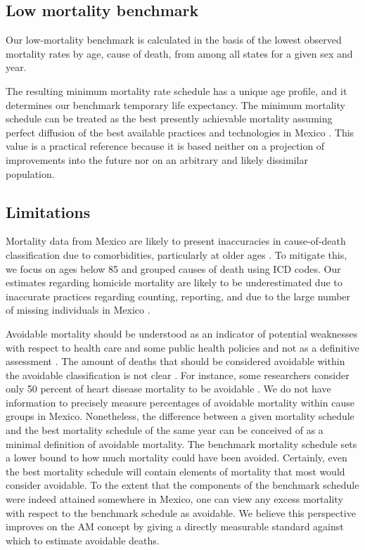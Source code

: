 \documentclass{bmcart}
\begin{document}
\subsection*{Low mortality benchmark}
Our low-mortality benchmark is calculated in the basis of the lowest observed mortality rates by age, cause of death, from among all states for a given sex and year.

The resulting minimum mortality rate schedule has a unique age profile, and it determines our benchmark temporary life expectancy. The minimum mortality schedule can be treated as the best presently achievable mortality assuming perfect diffusion of the best available practices and technologies in Mexico \cite{vallin2008minimum}. This value is a practical reference because it is based neither on a projection of improvements into the future nor on an arbitrary and likely dissimilar population. 


\subsection*{Limitations}
Mortality data from Mexico are
likely to present inaccuracies in cause-of-death classification due to
comorbidities, particularly at older ages \cite{tobias2001}. To mitigate this,
we focus on ages below 85 and grouped causes of death using ICD codes.
Our estimates regarding homicide mortality are likely to be
underestimated due to inaccurate practices regarding counting, reporting,
and due to the large number of missing individuals in Mexico \cite{HRW2011}.

Avoidable mortality should be understood as an indicator of potential
weaknesses with respect to health care and some public health policies and not
as a definitive assessment \cite{nolte&mckee2008}. The amount of deaths that should be considered avoidable within the avoidable classification is not clear \cite{beltran2011avoidable}. For instance, some researchers consider only 50 percent of heart disease mortality to be avoidable \cite{nolte2012amenable, holland2003}. We do not have information to precisely
measure percentages of avoidable mortality within cause groups in Mexico. Nonetheless, the
difference between a given mortality schedule and the best mortality schedule of
the same year can be conceived of as a minimal definition of avoidable
mortality. The benchmark mortality schedule sets a lower bound to how much mortality could have been avoided. Certainly, even the best mortality schedule will contain elements of mortality that
most would consider avoidable. To the extent that the components of the benchmark schedule were indeed
attained somewhere in Mexico, one can view any excess mortality
with respect to the benchmark schedule as avoidable. We believe this perspective improves on the AM concept by giving a directly measurable standard against which to estimate avoidable deaths.
\end{document}

